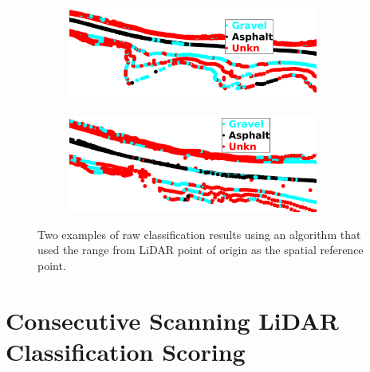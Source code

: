 \documentclass[numbered,pdftex]{ohio-etd}
\begin{document}
{{{		%
		\begin{figure}[H]
			\centering
			\begin{subfigure}[b]{\textwidth}
				\centering
				\includegraphics[width=0.9\textwidth]{Defense_Images/db_4_raw_range}
				\caption{}
				\label{fig:db_4_raw_range}
			\end{subfigure}
			\vspace{1cm} %
			\begin{subfigure}[b]{\textwidth}
				\centering
				\includegraphics[width=0.9\textwidth]{Defense_Images/db_6_raw_range}
				\caption{}
				\label{fig:db_6_raw_range}
			\end{subfigure}
			\caption[Raw Result Example - RANGE Spatial Reference Point]{Two examples of raw classification results using an algorithm that used the range from LiDAR point of origin as the spatial reference point. }
			\label{fig:range_raw_results_example}
		\end{figure}
		
	} %
	
	
	\section{Consecutive Scanning LiDAR Classification Scoring}\label{sec:consec_class_scoring}{
		
}}}
\end{document}
